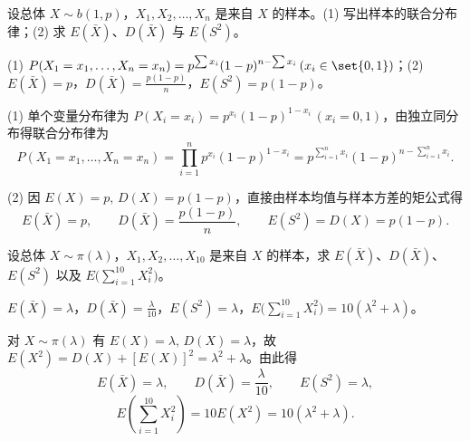 \begin{exercise}
设总体 $X\sim b(1,p)$，$X_1,X_2,\ldots,X_n$ 是来自 $X$ 的样本。(1) 写出样本的联合分布律；(2) 求 $E(\bar{X})$、$D(\bar{X})$ 与 $E(S^2)$。
\begin{answer}
(1) $P(X_1=x_1,\ldots,X_n=x_n)=p^{\sum x_i}(1-p)^{n-\sum x_i}\,(x_i\in\set{0,1})$；(2) $E(\bar{X})=p$，$D(\bar{X})=\frac{p(1-p)}{n}$，$E(S^2)=p(1-p)$。
\end{answer}
\begin{solution}
(1) 单个变量分布律为 $P(X_i=x_i)=p^{x_i}(1-p)^{1-x_i}\,(x_i=0,1)$，由独立同分布得联合分布律为
\[
  P(X_1=x_1,\ldots,X_n=x_n)=\prod_{i=1}^{n}p^{x_i}(1-p)^{1-x_i}
  =p^{\sum_{i=1}^{n}x_i}(1-p)^{n-\sum_{i=1}^{n}x_i}.
\]

(2) 因 $E(X)=p,\,D(X)=p(1-p)$，直接由样本均值与样本方差的矩公式得
\[
  E(\bar{X})=p,\qquad D(\bar{X})=\frac{p(1-p)}{n},\qquad E(S^2)=D(X)=p(1-p).
\]
\end{solution}
\end{exercise}

\begin{exercise}
设总体 $X\sim\pi(\lambda)$，$X_1,X_2,\ldots,X_{10}$ 是来自 $X$ 的样本，求 $E(\bar{X})$、$D(\bar{X})$、$E(S^2)$ 以及 $E\bigl(\sum_{i=1}^{10}X_i^2\bigr)$。
\begin{answer}
$E(\bar{X})=\lambda$，$D(\bar{X})=\frac{\lambda}{10}$，$E(S^2)=\lambda$，$E\bigl(\sum_{i=1}^{10}X_i^2\bigr)=10(\lambda^2+\lambda)$。
\end{answer}
\begin{solution}
对 $X\sim\pi(\lambda)$ 有 $E(X)=\lambda,\,D(X)=\lambda$，故 $E(X^2)=D(X)+[E(X)]^2=\lambda^2+\lambda$。由此得
\[
  E(\bar{X})=\lambda,\qquad D(\bar{X})=\frac{\lambda}{10},\qquad E(S^2)=\lambda,
\]
\[
  E\!\left(\sum_{i=1}^{10}X_i^2\right)=10E(X^2)=10(\lambda^2+\lambda).
\]
\end{solution}
\end{exercise}


